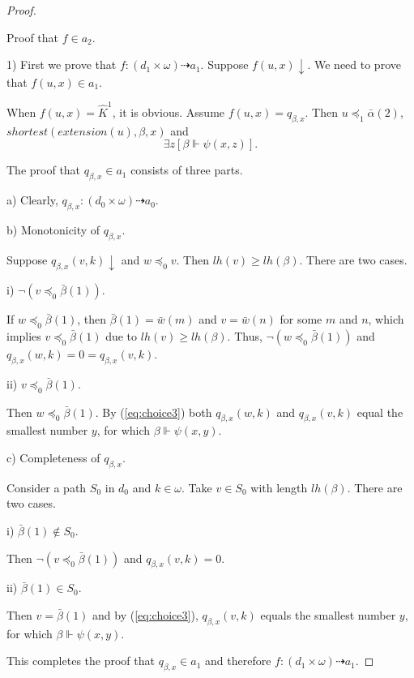 \documentclass{asl}
\theoremstyle{definition}
\begin{document}
\begin{proof}
\begin{center}
Proof that $f\in a_2$.
\end{center}
 
1) First we prove that $f:(d_1\times\omega)\dashrightarrow a_1$. 
Suppose $f(u,x)\downarrow$. We need to prove that $f(u,x)\in a_1$. 

When $f(u,x)=\widehat{K}^1$, it is obvious. Assume $f(u,x)=q_{\beta, x}$. Then 
$u\preccurlyeq_1\bar{\alpha}(2)$, $shortest(extension(u),\beta,x)$ and 
\begin{equation}
\exists z\left[\beta\Vdash \psi(x,z)\right]. 
\label{eq:choice3}
\end{equation}

The proof that $q_{\beta,x}\in a_1$ consists of three parts.

a) Clearly, $q_{\beta,x}:(d_0\times\omega)\dashrightarrow a_0$.

b) Monotonicity of $q_{\beta,x}$.

Suppose $q_{\beta,x}(v,k)\downarrow$ and $w\preccurlyeq_0v$. Then $lh(v)\geqslant lh(\beta)$. There are two cases.
\smallskip

i) $\neg(v\preccurlyeq_0 \bar{\beta}(1))$.

If $w\preccurlyeq_0 \bar{\beta}(1)$, then $\bar{\beta}(1)=\bar{w}(m)$ and $v=\bar{w}(n)$ for some $m$ and $n$, which 
\smallskip
\\implies $v\preccurlyeq_0 \bar{\beta}(1)$ due to $lh(v)\geqslant lh(\beta)$. Thus, $\neg(w\preccurlyeq_0 \bar{\beta}(1))$ and $q_{\beta,x}(w,k)=0=q_{\beta,x}(v,k)$.
\smallskip

ii) $v\preccurlyeq_0 \bar{\beta}(1)$.

Then $w\preccurlyeq_0 \bar{\beta}(1)$. By (\ref{eq:choice3}) both $q_{\beta,x}(w,k)$ and $q_{\beta,x}(v,k)$ equal the smallest number $y$, for which $\beta\Vdash \psi(x,y)$.

c) Completeness of $q_{\beta,x}$.

Consider a path $S_0$ in $d_0$ and $k\in \omega$. Take $v\in S_0$ with length $lh(\beta)$. There are two cases.

i) $\bar{\beta}(1)\notin S_0$.

Then $\neg(v\preccurlyeq_0 \bar{\beta}(1))$ and $q_{\beta,x}(v,k)=0$.

ii) $\bar{\beta}(1)\in S_0$.

Then $v=\bar{\beta}(1) $ and by (\ref{eq:choice3}), $q_{\beta,x}(v,k)$ equals the smallest number $y$, for which $\beta\Vdash \psi(x,y)$.

This completes the proof that $q_{\beta,x}\in a_1$ and therefore $f:(d_1\times\omega)\dashrightarrow a_1$.


\end{proof}
\end{document}
